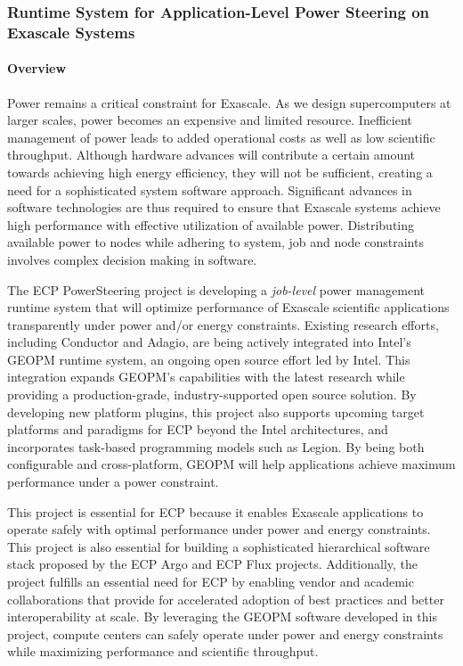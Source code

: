 \subsubsection{ Runtime System for Application-Level Power Steering on Exascale Systems} 

\paragraph{Overview} 
Power remains a critical constraint for Exascale. As we design supercomputers at larger scales, power becomes an expensive and limited resource. Inefficient management of power leads to added operational costs as well as low scientific throughput. Although hardware advances will contribute a certain amount towards achieving high energy efficiency, they will not be sufficient, creating a need for a sophisticated system software approach. Significant advances in software technologies are thus required to ensure that Exascale systems achieve high performance with effective utilization of available power. Distributing available power to nodes while adhering to system, job and node constraints involves complex decision making in software. 

The ECP PowerSteering project is developing a \emph{job-level} power management runtime system that will optimize performance of Exascale scientific applications transparently under power and/or energy constraints. Existing research efforts, including Conductor and Adagio, are being actively integrated into Intel's GEOPM runtime system, an ongoing open source effort led by Intel. This integration expands GEOPM's capabilities with the latest research while providing a production-grade, industry-supported open source solution. By developing new platform plugins, this project also supports upcoming target platforms and paradigms for ECP beyond the Intel architectures, and incorporates task-based programming models such as Legion. By being both configurable and cross-platform, GEOPM will help applications achieve maximum performance under a power constraint. 

This project is essential for ECP because it enables Exascale applications to operate safely with optimal performance under power and energy constraints. This project is also essential for building a sophisticated hierarchical software stack proposed by the ECP Argo and ECP Flux projects. Additionally, the project fulfills an essential need for ECP by enabling vendor and academic collaborations that provide for accelerated adoption of best practices and better interoperability at scale.  By leveraging the GEOPM software developed in this project, compute centers can safely operate under power and energy constraints while maximizing performance and scientific throughput. 


